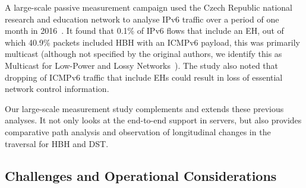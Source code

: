 \documentclass[conference]{IEEEtran}
\begin{document}


A large-scale passive measurement campaign used the Czech Republic national
research and education network to analyse IPv6 traffic over a period of one month in
2016~\cite{passive-threats}. It found that 0.1\% of IPv6 flows
that include an EH, out of which 40.9\% packets included HBH with an ICMPv6
payload, this was primarily multicast (although not specified by the original authors,
we identify this as Multicast for Low-Power and Lossy Networks~\cite{RFC7731}).
The study also noted that dropping of ICMPv6 traffic that include EHs could result in
loss of essential network control information. 


Our large-scale measurement study complements and extends these previous analyses. It not only
looks at the end-to-end support in servers, but also provides comparative path
analysis and observation of longitudinal changes in the traversal for HBH and DST.

\subsection{Challenges and Operational Considerations}
\end{document}

